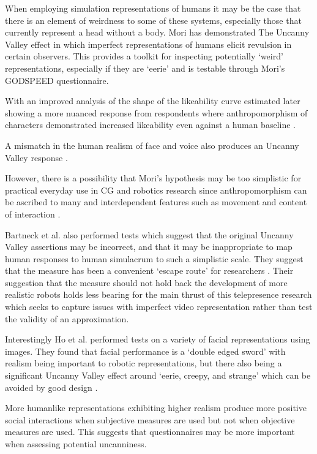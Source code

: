 When employing simulation representations of humans it may be the case that there is an element of weirdness to some of these systems, especially those that currently represent a head without a body. Mori has demonstrated The Uncanny Valley \cite{Mori1970} effect in which imperfect representations of humans elicit revulsion in certain observers. This provides a toolkit for inspecting potentially `weird' representations, especially if they are `eerie' and is testable through Mori's GODSPEED questionnaire. \par
                    With an improved analysis of the shape of the likeability curve estimated later showing a more nuanced response from respondents where anthropomorphism of characters demonstrated increased likeability even against a human baseline \cite{Bartneck2007, Bartneck2009a}.\par
                    A mismatch in the human realism of face and voice also produces an Uncanny Valley response \cite{Mitchell2011}.\par
                    However, there is a possibility that Mori's hypothesis may be too simplistic for practical everyday use in CG and robotics research since anthropomorphism can be ascribed to many and interdependent features such as movement and content of interaction \cite{Bartneck2009}.\par
                    Bartneck et al. also performed tests which suggest that the original Uncanny Valley assertions may be incorrect, and that it may be inappropriate to map human responses to human simulacrum to such a simplistic scale. They suggest that the measure has been a convenient `escape route' for researchers \cite{Bartneck2009}. Their suggestion that the measure should not hold back the development of more realistic robots holds less bearing for the main thrust of this telepresence research which seeks to capture issues with imperfect video representation rather than test the validity of an approximation.\par
                    Interestingly Ho et al. performed tests on a variety of facial representations using images.  They found that facial performance is a `double edged sword' with realism being important to robotic representations, but there also being a significant Uncanny Valley effect around `eerie, creepy, and strange' which can be avoided by good design \cite{Ho2008}.\par
                    More humanlike representations exhibiting higher realism produce more positive social interactions when subjective measures are used \cite{Yee2007a} but not when objective measures are used. This suggests that questionnaires may be more important when assessing potential uncanniness.\par
